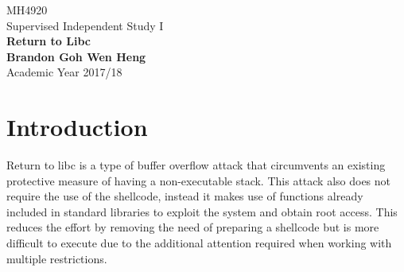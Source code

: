 \documentclass[a4paper,12pt]{article}
\begin{document}
	\begin{titlepage}
		\begin{center}
			\vspace*{9em}
			\Huge 
			MH4920\\ Supervised Independent Study I\\
			\vspace*{4em}
			\LARGE
			\textbf{Return to Libc\\}		
			\vspace{4em}
			\textbf{Brandon Goh Wen Heng}\\
			\vspace*{4em}
			Academic Year 2017/18
			\vfill
		\end{center}
	\end{titlepage}
	
	\tableofcontents
	\newpage
	\section{Introduction}
	Return to libc is a type of buffer overflow attack that circumvents an existing protective measure of having a non-executable stack. This attack also does not require the use of the shellcode, instead it makes use of functions already included in standard libraries to exploit the system and obtain root access. This reduces the effort by removing the need of preparing a shellcode but is more difficult to execute due to the additional attention required when working with multiple restrictions.
\end{document}

